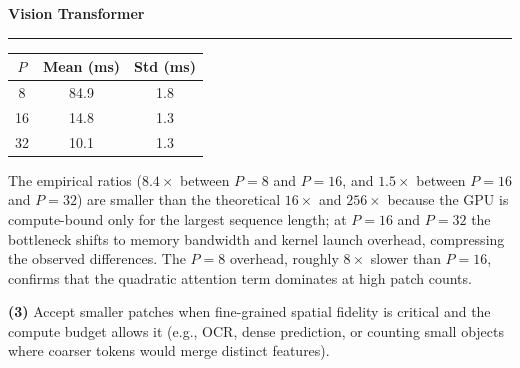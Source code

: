 \documentclass[11pt]{article}
\newenvironment{question}[1]
    {
        \begin{center}
        \textbf{#1} \rmfamily
        \bigskip
        \hrule
    }
    {
        \end{center}
    }
\begin{document}
\begin{question}{Vision Transformer}
\begin{enumerate}[label=(\alph*)]
    \begin{center}
    \begin{tabular}{ccc}
    \toprule
    $P$ & Mean (ms) & Std (ms) \\
    \midrule
    8  & 84.9 & 1.8 \\
    16 & 14.8 & 1.3 \\
    32 & 10.1 & 1.3 \\
    \bottomrule
    \end{tabular}
    \end{center}

    The empirical ratios ($8.4\times$ between $P=8$ and $P=16$, and $1.5\times$ between $P=16$ and $P=32$) are smaller than the theoretical $16\times$ and $256\times$ because the GPU is compute-bound only for the largest sequence length; at $P=16$ and $P=32$ the bottleneck shifts to memory bandwidth and kernel launch overhead, compressing the observed differences. The $P=8$ overhead, roughly $8\times$ slower than $P=16$, confirms that the quadratic attention term dominates at high patch counts.

    \textbf{(3)} Accept smaller patches when fine-grained spatial fidelity is critical and the compute budget allows it (e.g., OCR, dense prediction, or counting small objects where coarser tokens would merge distinct features).

\end{enumerate}
\end{question}
\end{document}
